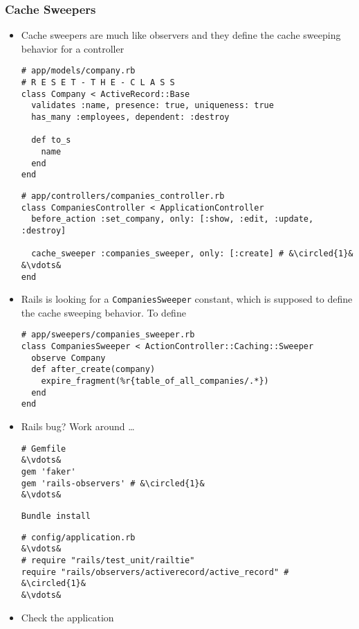 \documentclass{beamer}
\newcommand*\circled[1]{\tikz[baseline=(char.base)]{
            \node[shape=circle,draw,inner sep=2pt] (char) {#1};}}
\begin{document}
\begin{frame}
\frametitle{Cache Sweepers}
\begin{itemize}
\item Cache sweepers are much like observers and they define the cache sweeping behavior for a controller
\lstset{language=Ruby, style=eclipse}
\begin{lstlisting}[escapechar=&]
# app/models/company.rb
# R E S E T - T H E - C L A S S
class Company < ActiveRecord::Base
  validates :name, presence: true, uniqueness: true
  has_many :employees, dependent: :destroy

  def to_s
    name
  end
end
\end{lstlisting}

\lstset{language=Ruby, style=eclipse}
\begin{lstlisting}[escapechar=&]
# app/controllers/companies_controller.rb
class CompaniesController < ApplicationController
  before_action :set_company, only: [:show, :edit, :update, :destroy]

  cache_sweeper :companies_sweeper, only: [:create] # &\circled{1}&
&\vdots&
end
\end{lstlisting}
\item Rails is looking for a \texttt{CompaniesSweeper} constant, which is supposed to define the cache sweeping behavior. To define
\lstset{language=Ruby, style=eclipse}
\begin{lstlisting}[escapechar=&]
# app/sweepers/companies_sweeper.rb
class CompaniesSweeper < ActionController::Caching::Sweeper
  observe Company
  def after_create(company)
    expire_fragment(%r{table_of_all_companies/.*})
  end
end
\end{lstlisting}
\item Rails bug? Work around \dots
\lstset{language=Ruby, style=eclipse}
\begin{lstlisting}[escapechar=&]
# Gemfile
&\vdots&
gem 'faker'
gem 'rails-observers' # &\circled{1}&
&\vdots&
\end{lstlisting}
\texttt{Bundle install}

\lstset{language=Ruby, style=eclipse}
\begin{lstlisting}[escapechar=&]
# config/application.rb
&\vdots&
# require "rails/test_unit/railtie"
require "rails/observers/activerecord/active_record" # &\circled{1}&
&\vdots&
\end{lstlisting}

\item Check the application
\end{itemize}
\end{frame}
\end{document}
